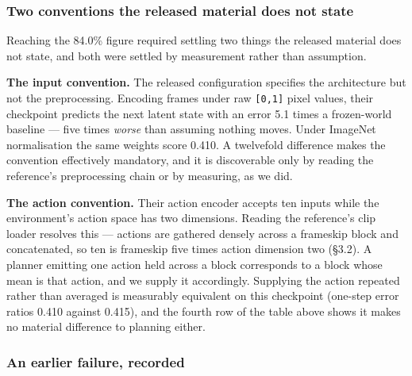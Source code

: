 \documentclass[10pt]{article}
\begin{document}
\subsubsection{Two conventions the released material does not state}\label{two-conventions-the-released-material-does-not-state}

Reaching the 84.0\% figure required settling two things the released material
does not state, and both were settled by measurement rather than assumption.

\textbf{The input convention.} The released configuration specifies the architecture
but not the preprocessing. Encoding frames under raw \texttt{{[}0,1{]}} pixel values, their
checkpoint predicts the next latent state with an error 5.1 times a
frozen-world baseline --- five times \emph{worse} than assuming nothing moves. Under
ImageNet normalisation the same weights score 0.410. A twelvefold difference
makes the convention effectively mandatory, and it is discoverable only by
reading the reference's preprocessing chain or by measuring, as we did.

\textbf{The action convention.} Their action encoder accepts ten inputs while the
environment's action space has two dimensions. Reading the reference's clip
loader resolves this --- actions are gathered densely across a frameskip block and
concatenated, so ten is frameskip five times action dimension two (\S{}3.2). A
planner emitting one action held across a block corresponds to a block whose
mean is that action, and we supply it accordingly. Supplying the action
repeated rather than averaged is measurably equivalent on this checkpoint
(one-step error ratios 0.410 against 0.415), and the fourth row of the table
above shows it makes no material difference to planning either.

\subsubsection{An earlier failure, recorded}\label{an-earlier-failure-recorded}
\end{document}
